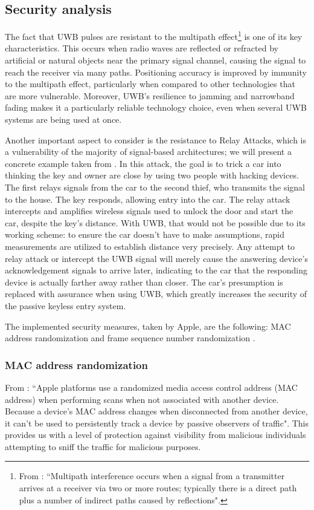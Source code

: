 \documentclass[english]{article}
\begin{document}
\subsection{Security analysis}
The fact that UWB pulses are resistant to the multipath effect\footnote{From \cite{Figueroa2022}: ``Multipath interference occurs when a signal from a transmitter arrives at a receiver via two or more routes; typically there is a direct path plus a number of indirect paths caused by reflections".} is one of its key characteristics. This occurs when radio waves are reflected or refracted by artificial or natural objects near the primary signal channel, causing the signal to reach the receiver via many paths. Positioning accuracy is improved by immunity to the multipath effect, particularly when compared to other technologies that are more vulnerable. Moreover, UWB's resilience to jamming and narrowband fading makes it a particularly reliable technology choice, even when several UWB systems are being used at once.

Another important aspect to consider is the resistance to Relay Attacks, which is a vulnerability of the majority of signal-based architectures; we will present a concrete example taken from \cite{Global_2020}. In this attack, the goal is to trick a car into thinking the key and owner are close by using two people with hacking devices. The first relays signals from the car to the second thief, who transmits the signal to the house. The key responds, allowing entry into the car. The relay attack intercepts and amplifies wireless signals used to unlock the door and start the car, despite the key's distance. With UWB, that would not be possible due to its working scheme: to ensure the car doesn't have to make assumptions, rapid measurements are utilized to establish distance very precisely. Any attempt to relay attack or intercept the UWB signal will merely cause the answering device's acknowledgement signals to arrive later, indicating to the car that the responding device is actually farther away rather than closer. The car's presumption is replaced with assurance when using UWB, which greatly increases the security of the passive keyless entry system.

The implemented security measures, taken by Apple, are the following: MAC address randomization and frame sequence number randomization \cite{aps}.

\subsubsection{MAC address randomization}
From \cite{aps}: ``Apple platforms use a randomized media access control address (MAC address) when performing scans when not associated with another device. Because a device’s MAC address changes when disconnected from another device, it can’t be used to persistently track a device by passive observers of traffic". This provides us with a level of protection against visibility from malicious individuals attempting to sniff the traffic for malicious purposes.
\end{document}
